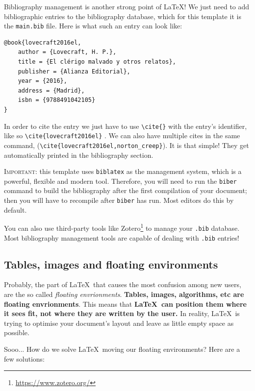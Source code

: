 Bibliography management is another strong point of \LaTeX! We just need to add bibliographic entries to the bibliography database, which for this template it is the \texttt{main.bib} file. Here is what such an entry can look like:

\begin{lstlisting}[language={[LaTeX]TeX}]
@book{lovecraft2016el,
	author = {Lovecraft, H. P.},
	title = {El clérigo malvado y otros relatos},
	publisher = {Alianza Editorial},
	year = {2016},
	address = {Madrid},
	isbn = {9788491042105}
}
\end{lstlisting}

In order to cite the entry we just have to use \verb|\cite{}| with the entry's identifier, like so \verb|\cite{lovecraft2016el}| \cite{lovecraft2016el}. We can also have multiple cites in the same command, \cite{lovecraft2016el,norton_creep} (\verb|\cite{lovecraft2016el,norton_creep}|). It is that simple! They get automatically printed in the bibliography section.

\textsc{\color{red}Important:} this template uses \texttt{biblatex} as the management system, which is a powerful, flexible and modern tool. Therefore, you will need to run the \texttt{biber} command to build the bibliography after the first compilation of your document; then you will have to recompile after \texttt{biber} has run. Most editors do this by default.

You can also use third-party tools like Zotero\footnote{\url{https://www.zotero.org/}} to manage your \verb|.bib| database. Most bibliography management tools are capable of dealing with \verb|.bib| entries!

\subsection{Tables, images and floating environments}

Probably, the part of \LaTeX\ that causes the most confusion among new users, are the so called \emph{floating envrionments}. \textbf{Tables, images, algorithms, etc are floating envrionments}. This means that \textbf{\LaTeX\ can position them where it sees fit, not where they are written by the user.} In reality, \LaTeX\ is trying to optimise your document's layout and leave as little empty space as possible.

Sooo... How do we solve \LaTeX\ moving our floating environments? Here are a few solutions:

